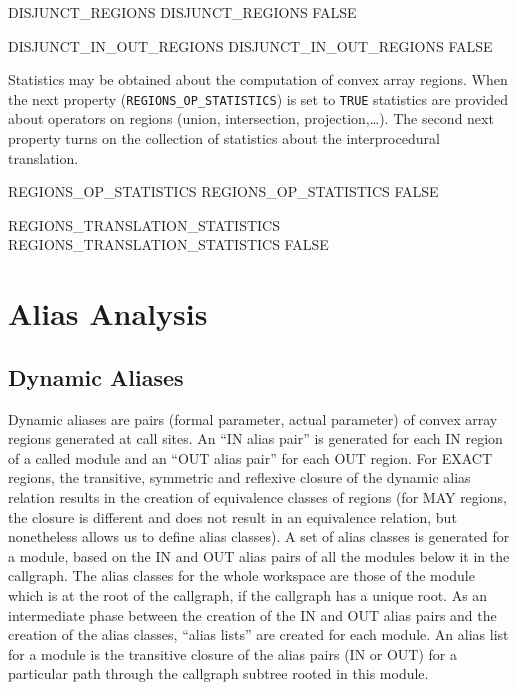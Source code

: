\documentclass[a4paper]{report}
\begin{document}
\begin{PipsProp}{DISJUNCT_REGIONS}
DISJUNCT_REGIONS FALSE
\end{PipsProp}

\begin{PipsProp}{DISJUNCT_IN_OUT_REGIONS}
DISJUNCT_IN_OUT_REGIONS FALSE
\end{PipsProp}

Statistics may be obtained about the computation of convex array
regions. When the next
property ({\tt REGIONS\_OP\_STATISTICS}) is set to {\tt TRUE} statistics are
provided about operators on regions (union, intersection,
projection,\dots). The second next property turns on the collection of
statistics about the interprocedural translation.

\begin{PipsProp}{REGIONS_OP_STATISTICS}
REGIONS_OP_STATISTICS FALSE
\end{PipsProp}

\begin{PipsProp}{REGIONS_TRANSLATION_STATISTICS}
REGIONS_TRANSLATION_STATISTICS FALSE
\end{PipsProp}



\section{Alias Analysis}
\label{subsection-alias-analysis}

\subsection{Dynamic Aliases}
\label{subsubsection-dynamic-aliases}

Dynamic aliases are pairs (formal parameter, actual parameter) of
convex array regions
generated at call sites. An ``IN alias pair'' is generated for each IN
region of
a called module and an ``OUT alias pair'' for each OUT region. For EXACT
regions, the transitive, symmetric and reflexive closure of the dynamic
alias relation results in the creation of equivalence classes of regions
(for MAY regions, the closure is different and does not
result in an equivalence relation, but nonetheless allows us to define alias
classes). A set of alias
classes is generated for a module, based on the IN and OUT alias
pairs of all the modules below it in the callgraph. The alias classes for
the whole workspace are those of the module which is at the root of the
callgraph, if the callgraph has a unique root. As an intermediate phase
between the creation of the
IN and OUT alias pairs and the creation of the alias classes, ``alias
lists'' are created for each module. An alias list for a module is the
transitive closure of the alias pairs (IN or OUT) for a particular path
through the callgraph subtree rooted in this module.
\end{document}
